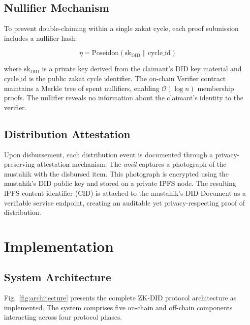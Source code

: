 \documentclass[conference]{IEEEtran}
\begin{document}
\subsection{Nullifier Mechanism}

To prevent double-claiming within a single zakat cycle, each proof submission includes a nullifier hash:

\begin{equation}
    \eta = \text{Poseidon}(\text{sk}_{\text{DID}} \| \text{cycle\_id})
\end{equation}

where $\text{sk}_{\text{DID}}$ is a private key derived from the claimant's DID key material and $\text{cycle\_id}$ is the public zakat cycle identifier. The on-chain Verifier contract maintains a Merkle tree of spent nullifiers, enabling $\mathcal{O}(\log n)$ membership proofs. The nullifier reveals no information about the claimant's identity to the verifier.

\subsection{Distribution Attestation}

Upon disbursement, each distribution event is documented through a privacy-preserving attestation mechanism. The \textit{amil} captures a photograph of the mustahik with the disbursed item. This photograph is encrypted using the mustahik's DID public key and stored on a private IPFS node. The resulting IPFS content identifier (CID) is attached to the mustahik's DID Document as a verifiable service endpoint, creating an auditable yet privacy-respecting proof of distribution.

\section{Implementation}

\subsection{System Architecture}

Fig.~\ref{fig:architecture} presents the complete ZK-DID protocol architecture as implemented. The system comprises five on-chain and off-chain components interacting across four protocol phases.
\end{document}
